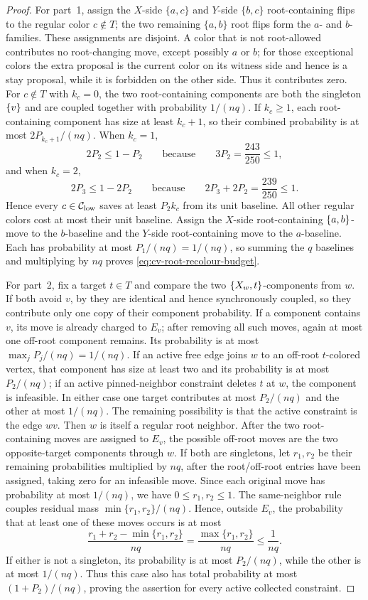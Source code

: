 \begin{proof}
For part~1, assign the \(X\)-side \(\{a,c\}\) and \(Y\)-side
\(\{b,c\}\) root-containing flips to the regular color \(c\notin T\);
the two remaining \(\{a,b\}\) root flips form the \(a\)- and
\(b\)-families.  These assignments are disjoint.  A
color that is not root-allowed contributes no root-changing move, except possibly
$a$ or $b$; for those exceptional colors the extra proposal is the
current color on its witness side and hence is a stay proposal, while it
is forbidden on the other side. Thus it contributes zero. For
$c\notin T$ with $k_c=0$, the two root-containing components are both the
singleton $\left\{v\right\}$ and are coupled together with probability $1/(nq)$.
If $k_c\ge1$, each root-containing component has size at least
$k_c+1$, so their combined probability is at most $2P_{k_c+1}/(nq)$. When
$k_c=1$,
\[
  2P_2\le1-P_2
  \qquad\text{because}\qquad 3P_2=\frac{243}{250}\le1,
\]
and when $k_c=2$,
\[
  2P_3\le1-2P_2
  \qquad\text{because}\qquad
  2P_3+2P_2=\frac{239}{250}\le1 .
\]
Hence every $c\in\mathcal C_{\rm low}$ saves at least $P_2k_c$ from its
unit baseline. All other regular colors cost at most their unit
baseline. Assign the $X$-side root-containing $\left\{a,b\right\}$-move to the
$b$-baseline and the $Y$-side root-containing move to the $a$-baseline.
Each has probability at most
$P_1/(nq)=1/(nq)$, so summing the $q$ baselines and multiplying by $nq$ proves
\eqref{eq:cv-root-recolour-budget}.

For part~2, fix a target $t\in T$ and compare the two
$\left\{X_w,t\right\}$-components from $w$. If both avoid $v$,
by  they are identical and hence
synchronously coupled, so they contribute only one copy of their component
probability. If a component contains $v$, its move is already charged to
$E_v$; after removing all such moves, again at most one off-root component
remains. Its probability is at most $\max_jP_j/(nq)=1/(nq)$. If an active free edge
joins $w$ to an off-root $t$-colored vertex, that component has size at
least two and its probability is at most $P_2/(nq)$; if an active pinned-neighbor constraint deletes
$t$ at $w$, the component is infeasible. In either case one target
contributes at most $P_2/(nq)$ and the other at most $1/(nq)$.
The remaining possibility is that the active constraint is the edge
$wv$. Then $w$ is itself a regular root neighbor. After the two
root-containing moves are assigned to $E_v$, the possible off-root moves
are the two opposite-target components through $w$. If both are
singletons, let $r_1,r_2$ be their remaining probabilities multiplied by
$nq$, after the root/off-root entries have been assigned, taking zero for
an infeasible move. Since each original move has probability at most
$1/(nq)$, we have $0\le r_1,r_2\le1$.
The same-neighbor rule couples residual mass $\min\{r_1,r_2\}/(nq)$.
Hence, outside $E_v$, the probability that at least one of these moves
occurs is at most
\[
 \frac{r_1+r_2-\min\{r_1,r_2\}}{nq}
 =\frac{\max\{r_1,r_2\}}{nq}\le\frac1{nq}.
\]
If either is not a singleton, its probability is
at most $P_2/(nq)$, while the other is at most $1/(nq)$. Thus this case also
has total probability at most $(1+P_2)/(nq)$, proving the assertion for every active
collected constraint.


\end{proof}
